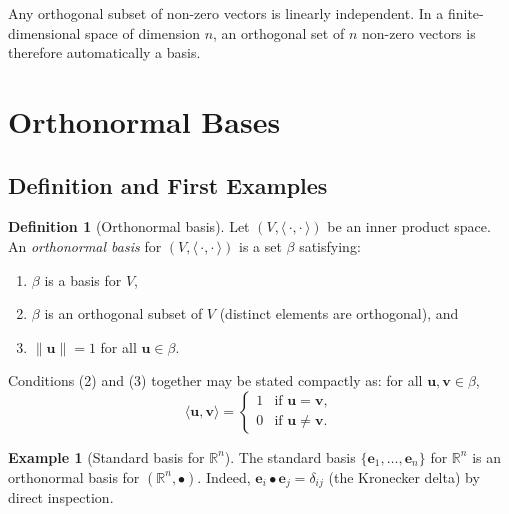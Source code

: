 \documentclass[11pt, a4paper, notitlepage]{report}
\theoremstyle{definition}
\newtheorem{definition}[theorem]{Definition}
\newtheorem{example}[theorem]{Example}
\theoremstyle{remark}
\begin{document}
\begin{keyresult}[title={Key Result: Orthogonal $\Rightarrow$ Linearly Independent}]
Any orthogonal subset of non-zero vectors is linearly independent.
In a finite-dimensional space of dimension $n$, an orthogonal set of $n$ non-zero vectors
is therefore automatically a basis.
\end{keyresult}

\section{Orthonormal Bases}
\label{sec:ONB}

\subsection{Definition and First Examples}
\label{subsec:ONB-def}

\begin{definition}[Orthonormal basis]
\label{def:ONB}
Let $(V,\langle\,\cdot,\cdot\,\rangle)$ be an inner product space.
An \emph{orthonormal basis} for $(V,\langle\,\cdot,\cdot\,\rangle)$ is a set $\beta$ satisfying:
\begin{enumerate}
  \item $\beta$ is a basis for $V$,
  \item $\beta$ is an orthogonal subset of $V$ (distinct elements are orthogonal), and
  \item $\|\mathbf{u}\| = 1$ for all $\mathbf{u}\in\beta$.
\end{enumerate}
Conditions (2) and (3) together may be stated compactly as: for all $\mathbf{u},\mathbf{v}\in\beta$,
\[
  \langle\mathbf{u},\mathbf{v}\rangle = \begin{cases} 1 & \text{if } \mathbf{u}=\mathbf{v}, \\ 0 & \text{if } \mathbf{u}\neq\mathbf{v}. \end{cases}
\]
\end{definition}

\begin{example}[Standard basis for $\mathbb{R}^n$]
\label{ex:ONB-Rn}
The standard basis $\{\mathbf{e}_1,\ldots,\mathbf{e}_n\}$ for $\mathbb{R}^n$ is an orthonormal
basis for $(\mathbb{R}^n,\bullet)$.
Indeed, $\mathbf{e}_i\bullet\mathbf{e}_j = \delta_{ij}$ (the Kronecker delta) by direct inspection.
\end{example}
\end{document}
